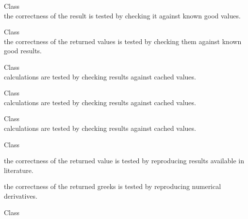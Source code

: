 \begin{DoxyRefList}
\item[Class \doxylink{class_quant_lib_1_1_filon_integral}{Quant\+Lib\+::Filon\+Integral} ]\hfill \\
\label{test__test000041}%
%
the correctness of the result is tested by checking it against known good values.  
\item[Class \doxylink{class_quant_lib_1_1_finite_difference_newton_safe}{Quant\+Lib\+::Finite\+Difference\+Newton\+Safe} ]\hfill \\
\label{test__test000070}%
%
the correctness of the returned values is tested by checking them against known good results. 
\item[Class \doxylink{class_quant_lib_1_1_fixed_rate_bond}{Quant\+Lib\+::Fixed\+Rate\+Bond} ]\hfill \\
\label{test__test000020}%
%
calculations are tested by checking results against cached values.  
\item[Class \doxylink{class_quant_lib_1_1_floating_cat_bond}{Quant\+Lib\+::Floating\+Cat\+Bond} ]\hfill \\
\label{test__test000008}%
%
calculations are tested by checking results against cached values.  
\item[Class \doxylink{class_quant_lib_1_1_floating_rate_bond}{Quant\+Lib\+::Floating\+Rate\+Bond} ]\hfill \\
\label{test__test000021}%
%
calculations are tested by checking results against cached values.  
\item[Class \doxylink{class_quant_lib_1_1_forward_performance_vanilla_engine}{Quant\+Lib\+::Forward\+Performance\+Vanilla\+Engine\texorpdfstring{$<$}{<} Engine \texorpdfstring{$>$}{>}} ]\hfill \\
\label{test__test000123}%
%

\begin{DoxyItemize}
\item the correctness of the returned value is tested by reproducing results available in literature.
\item the correctness of the returned greeks is tested by reproducing numerical derivatives. 
\end{DoxyItemize}
\item[Class \doxylink{class_quant_lib_1_1_forward_spreaded_term_structure}{Quant\+Lib\+::Forward\+Spreaded\+Term\+Structure} ]\hfill \\
\label{test__test000164}%
%


\end{DoxyRefList}
